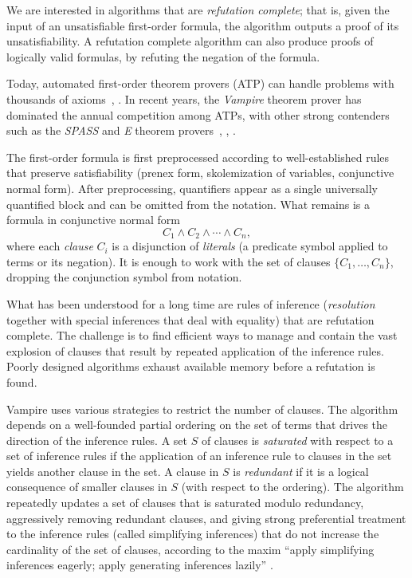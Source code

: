 \documentclass[brochure,english,12pt]{bourbaki}
\theoremstyle{plain}
\begin{document}
We are interested in algorithms that are {\it refutation complete}; that is, given
the input of an unsatisfiable first-order formula, the algorithm outputs 
a proof of its unsatisfiability.  A refutation complete
algorithm can also produce proofs of logically valid formulas, by refuting the negation of the formula.

Today, automated first-order theorem provers (ATP) can handle 
problems with thousands of axioms~\cite{bachmair2001resolution}, \cite{Ha09}.
In recent years, the {\it Vampire} 
theorem prover has
dominated the annual competition among ATPs, 
with other strong contenders such as the {\it SPASS} and {\it E} theorem provers~\cite{riazanov2002design},
\cite{WeidenbachDFKSW09}, \cite{Sch02-AICOMM}.  


The first-order formula is first preprocessed according to well-established rules that preserve satisfiability
(prenex form, skolemization of variables, conjunctive normal form).  After preprocessing, quantifiers appear
as a single universally quantified block and can be omitted from the notation.  What remains is a 
formula in conjunctive normal form
\[
C_1 \land C_2 \land \cdots \land C_n,
\]
where each {\it clause} $C_i$ is a disjunction of {\it literals} (a predicate symbol applied to terms or its negation).
It is enough to work with the set of clauses $\{C_1,\ldots,C_n\}$, dropping the conjunction
symbol from notation.

What has been understood for a long time are rules of inference ({\it resolution}  together with
special inferences that deal with equality) that are refutation complete.  The  challenge is to
find efficient ways to manage and contain the vast explosion of clauses that result by repeated
application of the inference rules.  Poorly designed algorithms exhaust available memory before
a refutation is found.

Vampire uses various strategies to restrict the number of clauses.  The algorithm
depends on a well-founded partial ordering on the set of terms  that drives the direction of the 
 inference rules.  
A set $S$ of clauses
is {\it saturated} with respect to a set of inference rules if the application of an inference rule to clauses in the set
yields another clause in the set.  A clause in $S$ is {\it redundant} if it is a logical consequence of smaller clauses
in $S$ (with respect to the ordering).  
The algorithm repeatedly updates a set of clauses that is saturated
modulo redundancy, aggressively removing redundant clauses, and giving strong preferential
treatment to the inference rules (called simplifying inferences) that do not increase the cardinality of the set of clauses,
according to the maxim
 ``apply simplifying inferences eagerly; apply generating inferences lazily'' \cite{kovacs2013first}.
\end{document}
